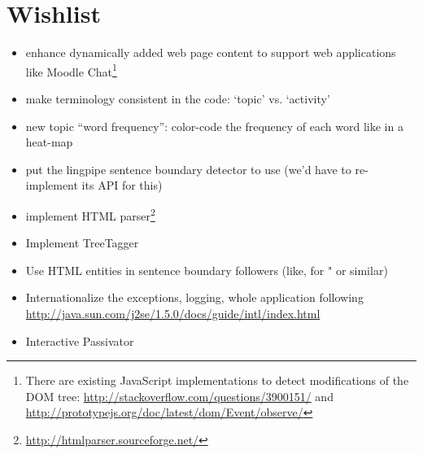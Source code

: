 \documentclass{article}
\begin{document}
\section{Wishlist}

\begin{itemize}
\item enhance dynamically added web page content to support web applications like Moodle Chat\footnote{There are existing JavaScript implementations to detect modifications of the DOM tree: \url{http://stackoverflow.com/questions/3900151/} and \url{http://prototypejs.org/doc/latest/dom/Event/observe/}}
\item make terminology consistent in the code: `topic' vs. `activity'
\item new topic ``word frequency'': color-code the frequency of each word like in a heat-map
\item put the lingpipe sentence boundary detector to use (we'd have to re-implement its API for this)
\item implement HTML parser\footnote{\url{http://htmlparser.sourceforge.net/}}
\item Implement TreeTagger
\item Use HTML entities in sentence boundary followers (like, for " or similar)
\item Internationalize the exceptions, logging, whole application following \url{http://java.sun.com/j2se/1.5.0/docs/guide/intl/index.html}
\item Interactive Passivator
\end{itemize}
\end{document}
